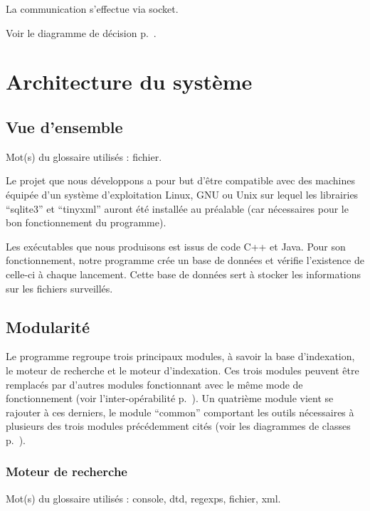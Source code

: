 \documentclass[a4paper,12pt]{report}
\begin{document}
La communication s'effectue via socket.

Voir le diagramme de décision p.~\pageref{decision-mi}.

\chapter{Architecture du système}

\section{Vue d'ensemble}
Mot(s) du glossaire utilisés : \gls{fichier}.

Le projet que nous développons a pour but d'être compatible avec des machines équipée d'un système d'exploitation Linux, GNU ou Unix sur lequel les librairies \enquote{sqlite3} et \enquote{tinyxml} auront été installée au préalable (car nécessaires pour le bon fonctionnement du programme).

Les exécutables que nous produisons est issus de code C++ et Java.
Pour son fonctionnement, notre programme crée un base de données et vérifie l'existence de celle-ci à chaque lancement. Cette base de données sert à stocker les informations sur les fichiers surveillés.

\section{Modularité}
Le programme regroupe trois principaux modules, à savoir la base d'indexation, le moteur de recherche  et le moteur d'indexation. Ces trois modules peuvent être remplacés par d'autres modules fonctionnant avec le même mode de fonctionnement (voir l'inter-opérabilité p.~\pageref{inter_operabilite}). Un quatrième module vient se rajouter à ces derniers, le module \enquote{common} comportant les outils nécessaires à plusieurs des trois modules précédemment cités (voir les diagrammes de classes p.~\pageref{common}).

\subsection{Moteur de recherche}
Mot(s) du glossaire utilisés : \gls{console}, \gls{dtd}, \glspl{regexp}, \gls{fichier}, \gls{xml}.
\end{document}
